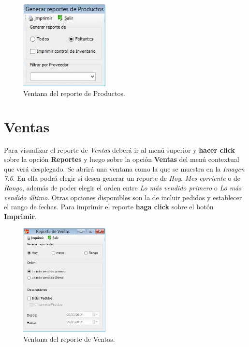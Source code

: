 \documentclass{book}
\begin{document}
\begin{figure}[H]
	\centering
	\includegraphics[width=0.4\textwidth]{images/ventanas/ventana-16.jpg}
	\caption{Ventana del reporte de Productos.}
	\medskip
\end{figure}


\section{Ventas}

Para visualizar el reporte de \textit{Ventas} deberá ir al menú superior y \textbf{hacer click} sobre la opción \textbf{Reportes} y luego sobre la opción \textbf{Ventas} del menú contextual que verá desplegado. Se abrirá una ventana como la que se muestra en la \textit{Imagen 7.6}. En ella podrá elegir si desea generar un reporte de \textit{Hoy}, \textit{Mes corriente} o de \textit{Rango}, además de poder elegir el orden entre \textit{Lo más vendido primero} o \textit{Lo más vendido último}. Otras opciones disponibles son la de incluir pedidos y establecer el rango de fechas. Para imprimir el reporte \textbf{haga click} sobre el botón \textbf{Imprimir}.
\bigskip

\begin{figure}[H]
	\centering
	\includegraphics[width=0.4\textwidth]{images/ventanas/ventana-17.jpg}
	\caption{Ventana del reporte de Ventas.}
	\medskip
\end{figure}
\end{document}
